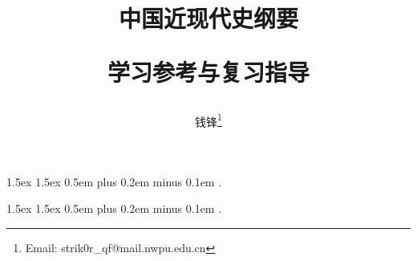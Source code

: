 \documentclass[10pt, UTF8]{ctexbook} %
\title{\textbf{中国近现代史纲要}

学习参考与复习指导}
\author{钱锋\thanks{Email: strik0r\_qf@mail.nwpu.edu.cn}}
\begin{document}
    {1.5ex}                                         %
    {1.5ex}                                         %
    {}                                              %
    {}                                              %
    {\bfseries}                                     %
    {}                                              %
    {0.5em plus 0.2em minus 0.1em}                  %
    {.}

\theoremstyle{mytheoremstyle} \newtheorem{example}{例}[section]
\theoremstyle{mytheoremstyle} \newtheorem{key}{核心要点}[section]

\theoremstyle{plain} \newtheorem{thm}{分析论述}

    {1.5ex}                                         %
    {1.5ex}                                         %
    {}                                              %
    {}                                              %
    {\kaishu}                                       %
    {}                                              %
    {0.5em plus 0.2em minus 0.1em}                  %
    {.}

\theoremstyle{my3theoremstyle}
\newtheorem*{remark}{注}
\newtheorem*{sol}{答案要点}
\end{document}
